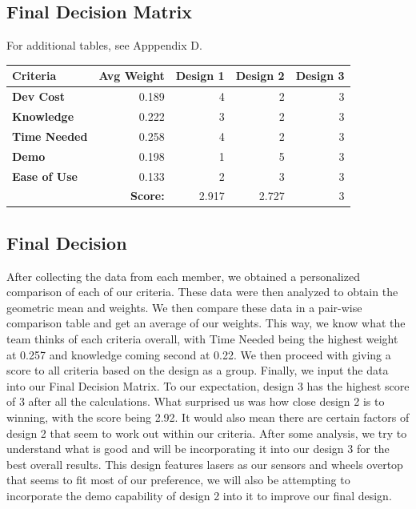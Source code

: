 \documentclass[12pt]{article}
\newcommand\cellhead[1]{\cellcolor{lightgray}\textbf{ #1 }}
\begin{document}
        \subsection{Final Decision Matrix}
            \noindent For additional tables, see Apppendix D.

            \begin{center}\begin{tabular}{|l|r|r|r|r|}
                \hline
                \cellhead{Criteria} & \cellhead{Avg Weight} & \cellhead{Design 1} & \cellhead{Design 2} & \cellhead{Design 3} \\\hline
                \cellhead{Dev Cost} & 0.189 & 4 & 2 & 3 \\\hline
                \cellhead{Knowledge}& 0.222 & 3 & 2 & 3 \\\hline
                \cellhead{Time Needed} & 0.258 & 4 & 2 & 3 \\\hline
                \cellhead{Demo} & 0.198 & 1 & 5 & 3 \\\hline
                \cellhead{Ease of Use} & 0.133 & 2 & 3 & 3 \\\hline
                & \cellhead{Score:} & 2.917 & 2.727 & 3 \\\hline
            \end{tabular}\end{center}
        
        \subsection{Final Decision}
            After collecting the data from each member, we obtained a personalized comparison of each of our criteria.
            These data were then analyzed to obtain the geometric mean and weights.
            We then compare these data in a pair-wise comparison table and get an average of our weights.
            This way, we know what the team thinks of each criteria overall, with Time Needed being the highest weight at 0.257 and knowledge coming second at 0.22.
            We then proceed with giving a score to all criteria based on the design as a group.
            Finally, we input the data into our Final Decision Matrix.
            To our expectation, design 3 has the highest score of 3 after all the calculations.
            What surprised us was how close design 2 is to winning, with the score being 2.92.
            It would also mean there are certain factors of design 2 that seem to work out within our criteria.
            After some analysis, we try to understand what is good and will be incorporating it into our design 3 for the best overall results.
            This design features lasers as our sensors and wheels overtop that seems to fit most of our preference, we will also be attempting to incorporate the demo capability of design 2 into it to improve our final design.
\end{document}
